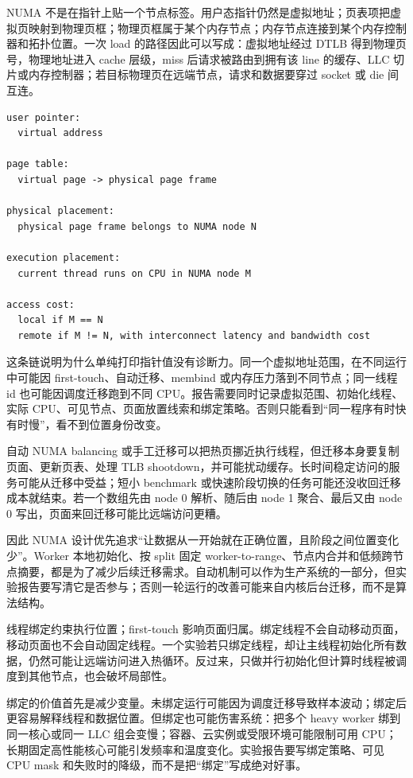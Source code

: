NUMA 不是在指针上贴一个节点标签。用户态指针仍然是虚拟地址；页表项把虚拟页映射到物理页框；物理页框属于某个内存节点；内存节点连接到某个内存控制器和拓扑位置。一次 load 的路径因此可以写成：虚拟地址经过 DTLB 得到物理页号，物理地址进入 cache 层级，miss 后请求被路由到拥有该 line 的缓存、LLC 切片或内存控制器；若目标物理页在远端节点，请求和数据要穿过 socket 或 die 间互连。

\begin{lstlisting}[numbers=none,caption={远端内存访问的身份链}]
user pointer:
  virtual address

page table:
  virtual page -> physical page frame

physical placement:
  physical page frame belongs to NUMA node N

execution placement:
  current thread runs on CPU in NUMA node M

access cost:
  local if M == N
  remote if M != N, with interconnect latency and bandwidth cost
\end{lstlisting}

这条链说明为什么单纯打印指针值没有诊断力。同一个虚拟地址范围，在不同运行中可能因 first-touch、自动迁移、membind 或内存压力落到不同节点；同一线程 id 也可能因调度迁移跑到不同 CPU。报告需要同时记录虚拟范围、初始化线程、实际 CPU、可见节点、页面放置线索和绑定策略。否则只能看到“同一程序有时快有时慢”，看不到位置身份改变。

自动 NUMA balancing 或手工迁移可以把热页挪近执行线程，但迁移本身要复制页面、更新页表、处理 TLB shootdown，并可能扰动缓存。长时间稳定访问的服务可能从迁移中受益；短小 benchmark 或快速阶段切换的任务可能还没收回迁移成本就结束。若一个数组先由 node 0 解析、随后由 node 1 聚合、最后又由 node 0 写出，页面来回迁移可能比远端访问更糟。

因此 NUMA 设计优先追求“让数据从一开始就在正确位置，且阶段之间位置变化少”。Worker 本地初始化、按 split 固定 worker-to-range、节点内合并和低频跨节点摘要，都是为了减少后续迁移需求。自动机制可以作为生产系统的一部分，但实验报告要写清它是否参与；否则一轮运行的改善可能来自内核后台迁移，而不是算法结构。

线程绑定约束执行位置；first-touch 影响页面归属。绑定线程不会自动移动页面，移动页面也不会自动固定线程。一个实验若只绑定线程，却让主线程初始化所有数据，仍然可能让远端访问进入热循环。反过来，只做并行初始化但计算时线程被调度到其他节点，也会破坏局部性。

绑定的价值首先是减少变量。未绑定运行可能因为调度迁移导致样本波动；绑定后更容易解释线程和数据位置。但绑定也可能伤害系统：把多个 heavy worker 绑到同一核心或同一 LLC 组会变慢；容器、云实例或受限环境可能限制可用 CPU；长期固定高性能核心可能引发频率和温度变化。实验报告要写绑定策略、可见 CPU mask 和失败时的降级，而不是把“绑定”写成绝对好事。

